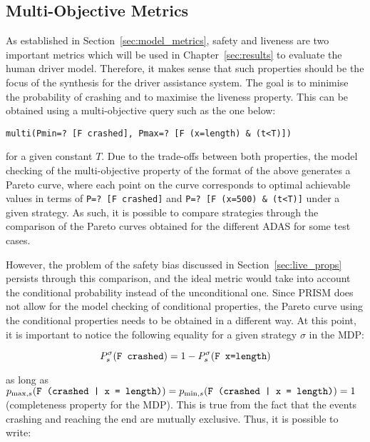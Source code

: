 \subsection{Multi-Objective Metrics}

As established in Section~\ref{sec:model_metrics}, safety and liveness are two important metrics which will be used in Chapter~\ref{sec:results} to evaluate the human driver model. Therefore, it makes sense that such properties should be the focus of the synthesis for the driver assistance system. The goal is to minimise the probability of crashing and to maximise the liveness property. This can be obtained using a multi-objective query such as the one below:

\begin{minipage}{\linewidth}
{\vspace{1em}
\begin{lstlisting}
multi(Pmin=? [F crashed], Pmax=? [F (x=length) & (t<T)])
\end{lstlisting}
}
\end{minipage}

for a given constant $T$. Due to the trade-offs between both properties, the model checking of the multi-objective property of the format of the above generates a Pareto curve, where each point on the curve corresponds to optimal achievable values in terms of \texttt{P=? [F crashed]} and \texttt{P=? [F (x=500) \& (t<T)]} under a given strategy. As such, it is possible to compare strategies through the comparison of the Pareto curves obtained for the different ADAS for some test cases.

However, the problem of the safety bias discussed in Section~\ref{sec:live_props} persists through this comparison, and the ideal metric would take into account the conditional probability instead of the unconditional one. Since PRISM does not allow for the model checking of conditional properties, the Pareto curve using the conditional properties needs to be obtained in a different way. At this point, it is important to notice the following equality for a given strategy $\sigma$ in the MDP:

\begin{equation}
	P^{\sigma}_s (\text{\texttt{F crashed}}) = 1 - P^{\sigma}_s (\text{\texttt{F x=length}})
\end{equation}

as long as $p_{\max, s} (\text{\texttt{F (crashed | x = length)}}) = p_{\min, s} (\text{\texttt{F (crashed | x = length)}}) = 1$ (completeness property for the MDP). This is true from the fact that the events crashing and reaching the end are mutually exclusive. Thus, it is possible to write:

